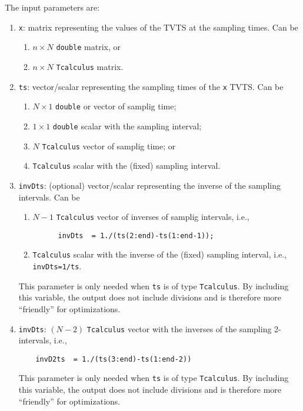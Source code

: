 \documentclass[11pt]{article}
\begin{document}
The input parameters are:
\begin{enumerate}
\item \lstinline{x}: matrix representing the values of the TVTS at the
  sampling times. Can be
  \begin{enumerate}
  \item $n\times N$ \lstinline{double} matrix, or
  \item $n\times N$ \lstinline{Tcalculus} matrix.
  \end{enumerate}

\item \lstinline{ts}: vector/scalar representing the sampling times of
  the \lstinline{x} TVTS. Can be
  \begin{enumerate}
  \item $N\times1$ \lstinline{double} or vector of samplig time;
  \item $1\times1$ \lstinline{double} scalar with the sampling interval;
  \item $N$ \lstinline{Tcalculus} vector of samplig time; or
  \item \lstinline{Tcalculus} scalar with the (fixed) sampling interval.
  \end{enumerate}
\item \lstinline{invDts}: (optional) vector/scalar representing the inverse of
  the sampling intervals. Can be
  \begin{enumerate}
  \item $N-1$ \lstinline{Tcalculus} vector of inverses of samplig
    intervals, i.e., 
    \begin{lstlisting}
      invDts  = 1./(ts(2:end)-ts(1:end-1));
    \end{lstlisting}
  \item \lstinline{Tcalculus} scalar with the inverse of the (fixed)
    sampling interval, i.e., \lstinline{invDts=1/ts}.
  \end{enumerate}
  This parameter is only needed when \lstinline{ts} is of type
  \lstinline{Tcalculus}.  By including this variable, the output does
  not include divisions and is therefore more ``friendly'' for
  optimizations.
\item \lstinline{invDts}: $(N-2)$ \lstinline{Tcalculus} vector with
  the inverses of the sampling 2-intervals, i.e.,
  \begin{lstlisting}
    invD2ts  = 1./(ts(3:end)-ts(1:end-2))
  \end{lstlisting}
  This parameter is only needed when \lstinline{ts} is of type
  \lstinline{Tcalculus}.  By including this variable, the output does
  not include divisions and is therefore more ``friendly'' for
  optimizations.

\end{enumerate}
\end{document}
